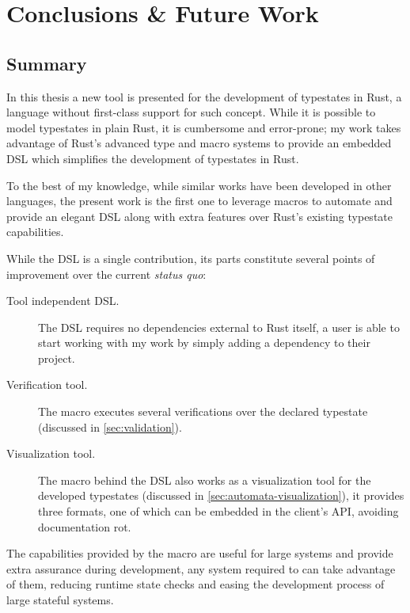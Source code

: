 

\chapter{Conclusions \& Future Work}\label{cha:conclusions}

\section{Summary}

In this thesis a new tool is presented for the development of typestates in Rust,
a language without first-class support for such concept.
While it is possible to model typestates in plain Rust, it is cumbersome and error-prone;
my work takes advantage of Rust's advanced type and macro systems
to provide an embedded DSL which simplifies the development of typestates in Rust.

To the best of my knowledge, while similar works have been developed in other languages,
the present work is the first one to leverage macros to automate
and provide an elegant DSL along with extra features over Rust's existing typestate capabilities.

While the DSL is a single contribution, its parts constitute several points of improvement over the current \emph{status quo}:
\begin{description}
    \item[Tool independent DSL.] The DSL requires no dependencies external to Rust itself,
    a user is able to start working with my work by simply adding a dependency to their project.
    \item[Verification tool.] The macro executes several verifications over the declared typestate (discussed in \autoref{sec:validation}).
    \item[Visualization tool.] The macro behind the DSL also works as a visualization tool for the developed typestates (discussed in \autoref{sec:automata-visualization}),
    it provides three formats, one of which can be embedded in the client's API, avoiding documentation rot.
\end{description}

The capabilities provided by the macro are useful for large systems and provide extra assurance during development,
any system required to  can take advantage of them,
reducing runtime state checks and easing the development process of large stateful systems.

